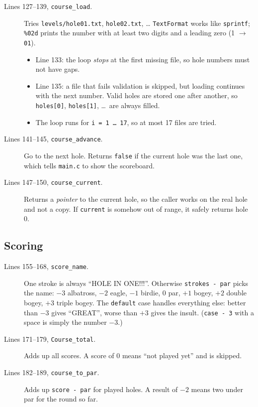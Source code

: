 \documentclass[11pt,a4paper]{article}
\newcommand{\code}[3]{}
\begin{document}
\begin{description}
  \item[Lines 127--139, \texttt{course\_load}.] Tries \texttt{levels/hole01.txt}, \texttt{hole02.txt}, \dots
  \texttt{TextFormat} works like \texttt{sprintf}; \texttt{\%02d} prints the number with at least two digits and a
  leading zero (1 $\to$ \texttt{01}).
  \begin{itemize}
    \item Line 133: the loop \emph{stops} at the first missing file, so hole numbers must not have gaps.
    \item Line 135: a file that fails validation is skipped, but loading continues with the next number.
    Valid holes are stored one after another, so \texttt{holes[0]}, \texttt{holes[1]}, \dots\ are always filled.
    \item The loop runs for \texttt{i = 1 \dots\ 17}, so at most 17 files are tried.
  \end{itemize}
  \item[Lines 141--145, \texttt{course\_advance}.] Go to the next hole. Returns \texttt{false} if the current hole was the
  last one, which tells \texttt{main.c} to show the scoreboard.
  \item[Lines 147--150, \texttt{course\_current}.] Returns a \emph{pointer} to the current hole, so the caller works
  on the real hole and not a copy. If \texttt{current} is somehow out of range, it safely returns hole 0.
\end{description}

\subsection{Scoring}

\code{level.c}{153}{189}

\begin{description}
  \item[Lines 155--168, \texttt{score\_name}.] One stroke is always ``HOLE IN ONE!!!''. Otherwise
  \texttt{strokes - par} picks the name: $-3$ albatross, $-2$ eagle, $-1$ birdie, 0 par, $+1$ bogey, $+2$ double bogey,
  $+3$ triple bogey. The \texttt{default} case handles everything else: better than $-3$ gives ``GREAT'', worse than
  $+3$ gives the insult. (\texttt{case - 3} with a space is simply the number $-3$.)
  \item[Lines 171--179, \texttt{Course\_total}.] Adds up all scores. A score of 0 means ``not played yet'' and is
  skipped.
  \item[Lines 182--189, \texttt{course\_to\_par}.] Adds up \texttt{score - par} for played holes. A result of $-2$ means
  two under par for the round so far.
\end{description}
\end{document}
